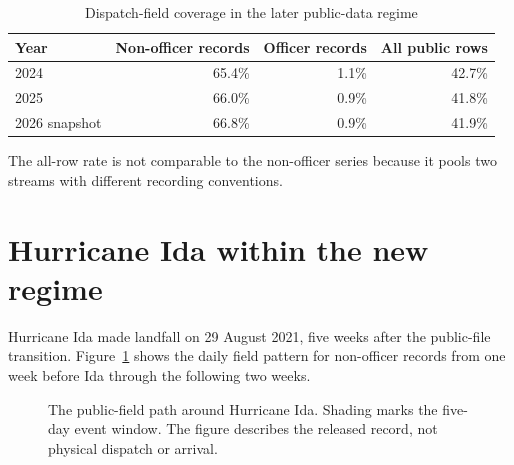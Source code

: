 \documentclass[11pt]{article}
\begin{document}
\begin{table}[!htbp]
\centering
\caption{Dispatch-field coverage in the later public-data regime}
\label{tab:current}
\begin{tabular}{@{}lrrr@{}}
\toprule
Year & Non-officer records & Officer records & All public rows \\
\midrule
2024 & 65.4\% & 1.1\% & 42.7\% \\
2025 & 66.0\% & 0.9\% & 41.8\% \\
2026 snapshot & 66.8\% & 0.9\% & 41.9\% \\
\bottomrule
\end{tabular}
\begin{minipage}{0.96\textwidth}\footnotesize
The all-row rate is not comparable to the non-officer series because it pools two streams with different recording conventions.
\end{minipage}
\end{table}

\section{Hurricane Ida within the new regime}

Hurricane Ida made landfall on 29 August 2021, five weeks after the public-file transition. Figure~\ref{fig:idapath} shows the daily field pattern for non-officer records from one week before Ida through the following two weeks.

\begin{figure}[!htbp]
\centering
{}
\caption{The public-field path around Hurricane Ida. Shading marks the five-day event window. The figure describes the released record, not physical dispatch or arrival.}
\label{fig:idapath}
\end{figure}
\end{document}
